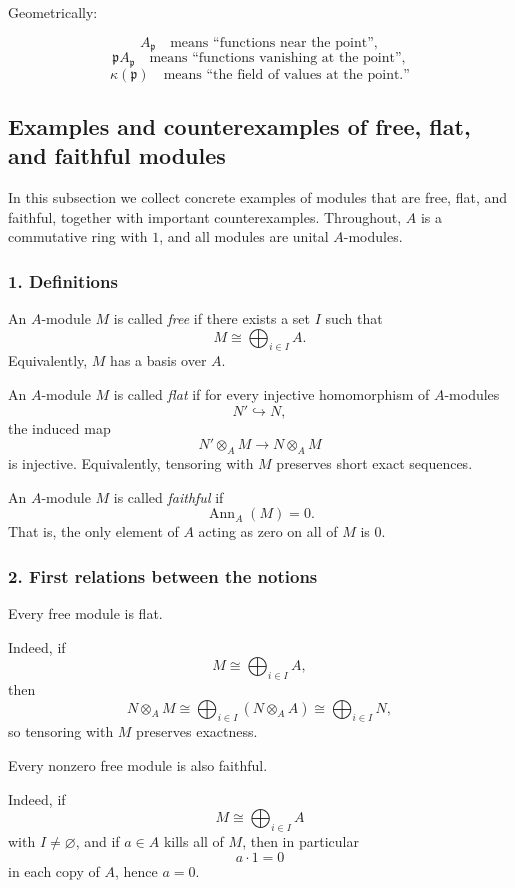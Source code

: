 \documentclass[12pt,a4paper]{article}
\theoremstyle{notespace}
\theoremstyle{definition}
\DeclareMathOperator{\Ann}{Ann}
\begin{document}
Geometrically:

\[
A_{\mathfrak p}
\quad\text{means ``functions near the point''},
\]
\[
\mathfrak p A_{\mathfrak p}
\quad\text{means ``functions vanishing at the point''},
\]
\[
\kappa(\mathfrak p)
\quad\text{means ``the field of values at the point.''}
\]

\subsection{Examples and counterexamples of free, flat, and faithful modules}

In this subsection we collect concrete examples of modules that are free, flat, and faithful, together with important counterexamples. Throughout, \(A\) is a commutative ring with \(1\), and all modules are unital \(A\)-modules.

\subsubsection{1. Definitions}

An \(A\)-module \(M\) is called \emph{free} if there exists a set \(I\) such that
\[
M \cong \bigoplus_{i\in I} A.
\]
Equivalently, \(M\) has a basis over \(A\).

An \(A\)-module \(M\) is called \emph{flat} if for every injective homomorphism of \(A\)-modules
\[
N' \hookrightarrow N,
\]
the induced map
\[
N'\otimes_A M \longrightarrow N\otimes_A M
\]
is injective. Equivalently, tensoring with \(M\) preserves short exact sequences.

An \(A\)-module \(M\) is called \emph{faithful} if
\[
\Ann_A(M)=0.
\]
That is, the only element of \(A\) acting as zero on all of \(M\) is \(0\).

\subsubsection{2. First relations between the notions}

Every free module is flat.

Indeed, if
\[
M\cong \bigoplus_{i\in I} A,
\]
then
\[
N\otimes_A M
\cong
\bigoplus_{i\in I} (N\otimes_A A)
\cong
\bigoplus_{i\in I} N,
\]
so tensoring with \(M\) preserves exactness.

Every nonzero free module is also faithful.

Indeed, if
\[
M\cong \bigoplus_{i\in I} A
\]
with \(I\neq \varnothing\), and if \(a\in A\) kills all of \(M\), then in particular
\[
a\cdot 1=0
\]
in each copy of \(A\), hence \(a=0\).
\end{document}
